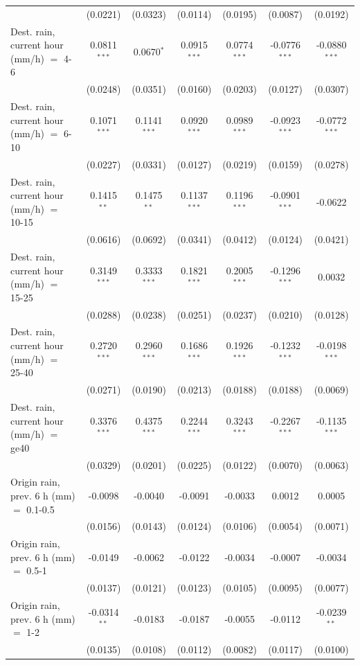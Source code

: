 \begin{tabular}{lcccccc}
    & (0.0221) & (0.0323) & (0.0114) & (0.0195) & (0.0087) & (0.0192)\\
   Dest. rain, current hour (mm/h) $=$ 4-6 & 0.0811$^{***}$ & 0.0670$^{*}$ & 0.0915$^{***}$ & 0.0774$^{***}$ & -0.0776$^{***}$ & -0.0880$^{***}$\\
    & (0.0248) & (0.0351) & (0.0160) & (0.0203) & (0.0127) & (0.0307)\\
   Dest. rain, current hour (mm/h) $=$ 6-10 & 0.1071$^{***}$ & 0.1141$^{***}$ & 0.0920$^{***}$ & 0.0989$^{***}$ & -0.0923$^{***}$ & -0.0772$^{***}$\\
    & (0.0227) & (0.0331) & (0.0127) & (0.0219) & (0.0159) & (0.0278)\\
   Dest. rain, current hour (mm/h) $=$ 10-15 & 0.1415$^{**}$ & 0.1475$^{**}$ & 0.1137$^{***}$ & 0.1196$^{***}$ & -0.0901$^{***}$ & -0.0622\\
    & (0.0616) & (0.0692) & (0.0341) & (0.0412) & (0.0124) & (0.0421)\\
   Dest. rain, current hour (mm/h) $=$ 15-25 & 0.3149$^{***}$ & 0.3333$^{***}$ & 0.1821$^{***}$ & 0.2005$^{***}$ & -0.1296$^{***}$ & 0.0032\\
    & (0.0288) & (0.0238) & (0.0251) & (0.0237) & (0.0210) & (0.0128)\\
   Dest. rain, current hour (mm/h) $=$ 25-40 & 0.2720$^{***}$ & 0.2960$^{***}$ & 0.1686$^{***}$ & 0.1926$^{***}$ & -0.1232$^{***}$ & -0.0198$^{***}$\\
    & (0.0271) & (0.0190) & (0.0213) & (0.0188) & (0.0188) & (0.0069)\\
   Dest. rain, current hour (mm/h) $=$ ge40 & 0.3376$^{***}$ & 0.4375$^{***}$ & 0.2244$^{***}$ & 0.3243$^{***}$ & -0.2267$^{***}$ & -0.1135$^{***}$\\
    & (0.0329) & (0.0201) & (0.0225) & (0.0122) & (0.0070) & (0.0063)\\
   Origin rain, prev. 6 h (mm) $=$ 0.1-0.5 & -0.0098 & -0.0040 & -0.0091 & -0.0033 & 0.0012 & 0.0005\\
    & (0.0156) & (0.0143) & (0.0124) & (0.0106) & (0.0054) & (0.0071)\\
   Origin rain, prev. 6 h (mm) $=$ 0.5-1 & -0.0149 & -0.0062 & -0.0122 & -0.0034 & -0.0007 & -0.0034\\
    & (0.0137) & (0.0121) & (0.0123) & (0.0105) & (0.0095) & (0.0077)\\
   Origin rain, prev. 6 h (mm) $=$ 1-2 & -0.0314$^{**}$ & -0.0183 & -0.0187 & -0.0055 & -0.0112 & -0.0239$^{**}$\\
    & (0.0135) & (0.0108) & (0.0112) & (0.0082) & (0.0117) & (0.0100)\\

\end{tabular}
